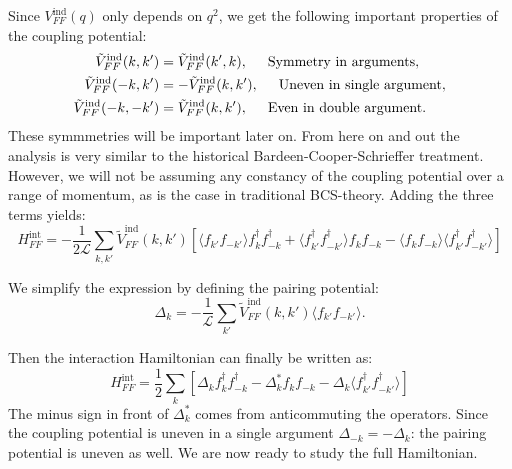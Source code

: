 Since $V^\text{ind}_{FF}(q)$ only depends on $q^2$, we get the following important properties of the coupling potential: 
\begin{align}
\tilde{V}^\text{ind}_{FF}(k,k') &= \tilde{V}^\text{ind}_{FF}(k',k), \hspace{0.5cm} \text{Symmetry in arguments}, \nonumber \\
\tilde{V}^\text{ind}_{FF}(-k,k') &= -\tilde{V}^\text{ind}_{FF}(k,k'), \hspace{0.5cm} \text{Uneven in single argument}, \nonumber \\
\tilde{V}^\text{ind}_{FF}(-k,-k') &= \tilde{V}^\text{ind}_{FF}(k,k'), \hspace{0.5cm} \text{Even in double argument}.
\label{eq.CouplingPotentialSymmetries}
\end{align}
These symmmetries will be important later on. From here on and out the analysis is very similar to the historical Bardeen-Cooper-Schrieffer treatment. However, we will not be assuming any constancy of the coupling potential over a range of momentum, as is the case in traditional BCS-theory\cite{Tinkham,LandauStatPhys2,PlischkeStatPhys}. Adding the three terms yields:
\begin{equation}
H^\text{int}_{FF} = -\frac{1}{2\mathcal{L}}\sum_{k,k'} \tilde{V}^\text{ind}_{FF}(k,k')\left[ \langle f_{k'}f_{-k'} \rangle f^\dagger_k f^\dagger_{-k} + \langle f^\dagger_{k'}f^\dagger_{-k'} \rangle f_k f_{-k} - \langle f_{k}f_{-k} \rangle  \langle f^\dagger_{k'}f^\dagger_{-k'} \rangle \right] \nonumber
\end{equation}

We simplify the expression by defining the pairing potential:
\begin{equation}
\Delta_k = -\frac{1}{\mathcal{L}}\sum_{k'}\tilde{V}^\text{ind}_{FF}(k,k')\langle f_{k'}f_{-k'} \rangle.
\label{eq.pairingpotentialdef}
\end{equation}

Then the interaction Hamiltonian can finally be written as:
\begin{equation}
H^\text{int}_{FF} = \frac{1}{2}\sum_{k} \left[ \Delta_k f^\dagger_k f^\dagger_{-k} - \Delta^*_k f_k f_{-k} - \Delta_k \langle f^\dagger_{k'}f^\dagger_{-k'} \rangle \right]
\label{eq.HFFintfinal}
\end{equation}
The minus sign in front of $\Delta^*_k$ comes from anticommuting the operators. Since the coupling potential is uneven in a single argument $\Delta_{-k} = -\Delta_k$: the pairing potential is uneven as well. We are now ready to study the full Hamiltonian.

